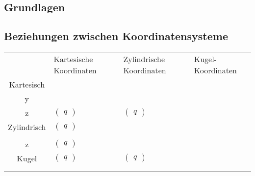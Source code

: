 	\begin{multicols}{2}
		\begin{minipage}{.5\paperheight}
			\maketitle
			\tableofcontents
		\end{minipage}
		\section{Grundlagen}
		\subsection{Beziehungen zwischen Koordinatensysteme}
		\begin{tabularx}{.5\textwidth}{c|X|X|X|}
			& Kartesische Koordinaten & Zylindrische Koordinaten & Kugel-Koordinaten\\
			Kartesisch & \(\begin{pmatrix} x\\ y\\ z\end{pmatrix}\) & \(\begin{pmatrix}q\end{pmatrix}\) & \(\begin{pmatrix}q\end{pmatrix}\) \\
			Zylindrisch & \(\begin{pmatrix}q\end{pmatrix}\) & \(\begin{pmatrix} \rho\\ \varphi\\ z\end{pmatrix}\) &  \(\begin{pmatrix}q\end{pmatrix}\) \\
			Kugel & \(\begin{pmatrix}q\end{pmatrix}\) & \(\begin{pmatrix}q\end{pmatrix}\) & \(\begin{pmatrix} r\\ \theta\\ \varphi\end{pmatrix}\)%
		\end{tabularx}
	\end{multicols}
